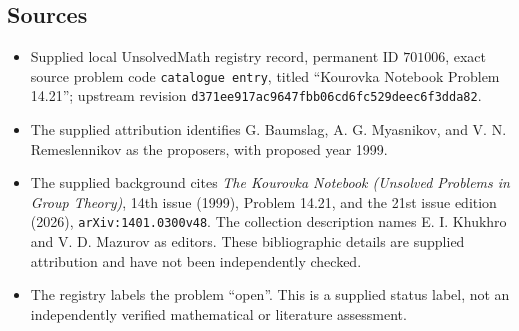 \documentclass[11pt]{article}
\begin{document}
\subsection{Sources}
\begin{itemize}
\item Supplied local UnsolvedMath registry record, permanent ID \(701006\), exact source problem code \texttt{catalogue entry}, titled ``Kourovka Notebook Problem 14.21''; upstream revision \texttt{d371ee917ac9647fbb06cd6fc529deec6f3dda82}.
\item The supplied attribution identifies G. Baumslag, A. G. Myasnikov, and V. N. Remeslennikov as the proposers, with proposed year 1999.
\item The supplied background cites \emph{The Kourovka Notebook (Unsolved Problems in Group Theory)}, 14th issue (1999), Problem 14.21, and the 21st issue edition (2026), \texttt{arXiv:1401.0300v48}. The collection description names E. I. Khukhro and V. D. Mazurov as editors. These bibliographic details are supplied attribution and have not been independently checked.
\item The registry labels the problem ``open''. This is a supplied status label, not an independently verified mathematical or literature assessment.
\end{itemize}
\end{document}
